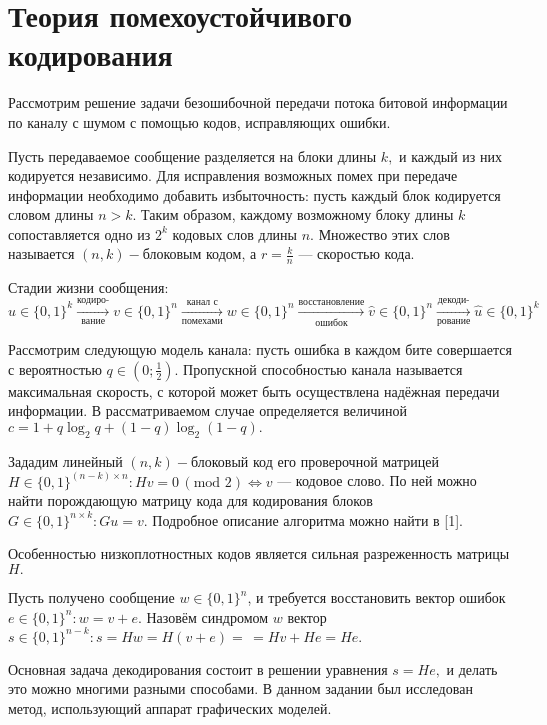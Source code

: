 \documentclass[12pt,a4paper,oneside,fleqn,leqno]{article}
\begin{document}
	\section{Теория помехоустойчивого кодирования}
		Рассмотрим решение задачи безошибочной передачи потока битовой информации по каналу с шумом с помощью кодов, исправляющих ошибки.\par
		Пусть передаваемое сообщение разделяется на блоки длины $k,$ и каждый из них кодируется независимо. Для исправления возможных помех при передаче информации необходимо добавить избыточность: пусть каждый блок кодируется словом длины $n > k.$ Таким образом, каждому возможному блоку длины $k$ сопоставляется одно из $2 ^ k$ кодовых слов длины $n$. Множество этих слов называется $(n, k)-$блоковым кодом, а $r = \frac{k}{n}$ --- скоростью кода.\par
		Стадии жизни сообщения:
		$$
			u \in \{0, 1\}^k \xrightarrow[\text{вание}]{\text{кодиро-}} v \in \{0, 1\}^n \xrightarrow[\text{помехами}]{\text{канал с}} w \in \{0, 1\}^n \xrightarrow[\text{ошибок}]{\text{восстановление}} \hat{v} \in \{0, 1\}^n \xrightarrow[\text{рование}]{\text{декоди-}} \hat{u} \in \{0, 1\}^k
		$$\par
		Рассмотрим следующую модель канала: пусть ошибка в каждом бите совершается с вероятностью $q \in \left (0; \frac{1}{2}\right).$ Пропускной способностью канала называется максимальная скорость, с которой может быть осуществлена надёжная передачи информации. В рассматриваемом случае определяется величиной $c = 1 + q\log_2q + (1 - q)\log_2(1 - q).$\par
		Зададим линейный $(n, k)-$блоковый код его проверочной матрицей $H \in \{0, 1\}^{(n - k)\times n}: Hv = 0\,(\text{mod}\,\,2) \iff v$ --- кодовое слово. По ней можно найти порождающую матрицу кода для кодирования блоков $G \in \{0, 1\}^{n\times k}: Gu=v.$ Подробное описание алгоритма можно найти в [1].\par
		Особенностью низкоплотностных кодов является сильная разреженность матрицы $H.$\par
		Пусть получено сообщение $w \in \{0, 1\}^n$, и требуется восстановить вектор ошибок $e\in \{0, 1\}^n: w = v + e.$ Назовём синдромом $w$ вектор $s \in \{0, 1\}^{n - k}: s = Hw = H(v + e) =\,= Hv + He = He.$ \par
		Основная задача декодирования состоит в решении уравнения $s = He,$ и делать это можно многими разными способами. В данном задании был исследован метод, использующий аппарат графических моделей.\par
\end{document}
